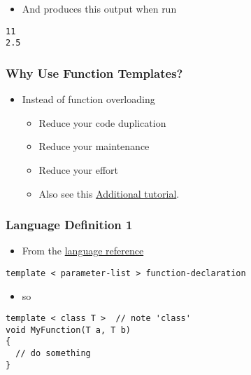 \begin{itemize}
\tightlist
\item
  And produces this output when run
\end{itemize}

\begin{verbatim}
11
2.5
\end{verbatim}

\hypertarget{why-use-function-templates}{%
\subsubsection{Why Use Function
Templates?}\label{why-use-function-templates}}

\begin{itemize}
\tightlist
\item
  Instead of function overloading

  \begin{itemize}
  \tightlist
  \item
    Reduce your code duplication
  \item
    Reduce your maintenance
  \item
    Reduce your effort
  \item
    Also see this
    \href{http://www.codeproject.com/Articles/257589/An-Idiots-Guide-to-Cplusplus-Templates-Part}{Additional
    tutorial}.
  \end{itemize}
\end{itemize}

\hypertarget{language-definition-1}{%
\subsubsection{Language Definition 1}\label{language-definition-1}}

\begin{itemize}
\tightlist
\item
  From the
  \href{http://en.cppreference.com/w/cpp/language/function_template}{language
  reference}
\end{itemize}

\begin{verbatim}
template < parameter-list > function-declaration
\end{verbatim}

\begin{itemize}
\tightlist
\item
  so
\end{itemize}

\begin{verbatim}
template < class T >  // note 'class'
void MyFunction(T a, T b)
{
  // do something
}
\end{verbatim}

